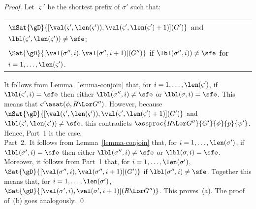 \documentclass[runningheads]{llncs}
\begin{document}
\begin{proof}
Let $\varsigma'$ be the shortest prefix of $\sigma'$ such that:
\begin{center}
\renewcommand{\arraystretch}{1.25}
\begin{tabular}[t]{@{}l@{}}
$\nSat{\gD}
      {[\val(\varsigma',\len(\varsigma')),
        \val(\varsigma',\len(\varsigma')+1)](G')}$ and
$\lbl(\varsigma',\len(\varsigma')) \neq \sfe$;
\\
$\Sat{\gD}{[\val(\sigma'',i),\val(\sigma'',i+1)](G'')}$
if $\lbl(\sigma'',i)) \neq \sfe$ for $i = 1, \ldots, \len(\varsigma')$.
\end{tabular}
\end{center}
It follows from Lemma~\ref{lemma-conjoin} that, for 
$i = 1, \ldots, \len(\varsigma')$, if $\lbl(\varsigma',i) = \sfe$ then
either $\lbl(\sigma'',i) \neq \sfe$ or $\lbl(\sigma,i) = \sfe$.
This means that $\varsigma' \asat(\phi,R \Lor G'')$.
However,  
because 
$\nSat{\gD}
      {[\val(\varsigma',\len(\varsigma')),
        \val(\varsigma',\len(\varsigma')+1)](G')}$
and $\lbl(\varsigma',\len(\varsigma')) \neq \sfe$,
this contradicts $\assproc{R \Lor G''}{G'}{\phi}{p}{\psi'}$.
Hence, Part~1 is the case.
\\[1ex]
Part~2.\, 
It follows from Lemma~\ref{lemma-conjoin} that, for 
$i = 1, \ldots, \len(\sigma')$, if $\lbl(\sigma',i) = \sfe$ then
either $\lbl(\sigma'',i) \neq \sfe$ or $\lbl(\sigma,i) = \sfe$.
Moreover, it follows from Part~1 that, 
for $i = 1, \ldots, \len(\sigma')$,
$\Sat{\gD}{[\val(\sigma'',i),\val(\sigma'',i+1)](G')}$ 
if $\lbl(\sigma'',i) \neq \sfe$.
Together this means that, for $i = 1, \ldots, \len(\sigma')$, 
$\Sat{\gD}{[\val(\sigma',i),\val(\sigma',i+1)](R \Lor G'')}$.
This proves~(a). The proof of~(b) goes analogously.
\qed
\end{proof}
\end{document}
